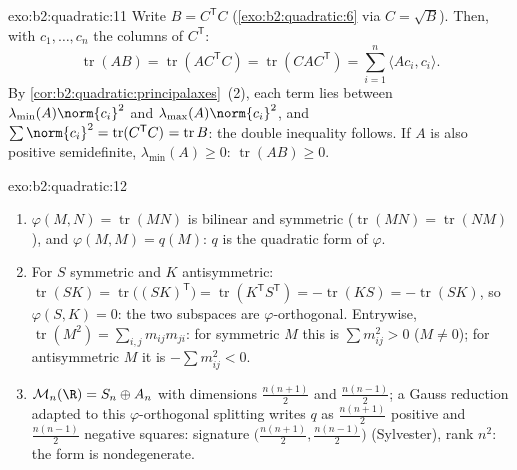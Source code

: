 \begin{solution}{exo:b2:quadratic:11}
Write $B = C^{\mathsf T}C$ (\cref{exo:b2:quadratic:6} via $C =
\sqrt B$). Then, with $c_1, \dots, c_n$ the columns of
$C^{\mathsf T}$:
\[
\operatorname{tr}(AB) = \operatorname{tr}(AC^{\mathsf T}C)
= \operatorname{tr}(CAC^{\mathsf T})
= \sum_{i=1}^n \langle A c_i, c_i\rangle .
\]
By \cref{cor:b2:quadratic:principalaxes}~(2), each term lies
between $\lambda_{\min}(A)\norm{c_i}^2$ and
$\lambda_{\max}(A)\norm{c_i}^2$, and $\sum\norm{c_i}^2 =
\operatorname{tr}(C^{\mathsf T}C)^{\vphantom1} =
\operatorname{tr} B$: the double inequality follows. If $A$ is
also positive semidefinite, $\lambda_{\min}(A) \geq 0$:
$\operatorname{tr}(AB) \geq 0$.
\end{solution}

\begin{solution}{exo:b2:quadratic:12}
\begin{enumerate}
  \item $\varphi(M, N) = \operatorname{tr}(MN)$ is bilinear and
        symmetric ($\operatorname{tr}(MN) =
        \operatorname{tr}(NM)$), and $\varphi(M, M) = q(M)$:
        $q$ is the quadratic form of $\varphi$.
  \item For $S$ symmetric and $K$ antisymmetric:
        $\operatorname{tr}(SK) =
        \operatorname{tr}\bigl((SK)^{\mathsf T}\bigr) =
        \operatorname{tr}(K^{\mathsf T}S^{\mathsf T}) =
        -\operatorname{tr}(KS) = -\operatorname{tr}(SK)$, so
        $\varphi(S, K) = 0$: the two subspaces are
        $\varphi$-orthogonal. Entrywise, $\operatorname{tr}
        (M^2) = \sum_{i,j} m_{ij}m_{ji}$: for symmetric $M$
        this is $\sum m_{ij}^2 > 0$ ($M \neq 0$); for
        antisymmetric $M$ it is $-\sum m_{ij}^2 < 0$.
  \item $\mathcal M_n(\R) = S_n \oplus A_n$ with dimensions
        $\frac{n(n+1)}2$ and $\frac{n(n-1)}2$; a Gauss
        reduction adapted to this $\varphi$-orthogonal
        splitting writes $q$ as $\frac{n(n+1)}2$ positive and
        $\frac{n(n-1)}2$ negative squares: signature
        $\bigl(\frac{n(n+1)}2, \frac{n(n-1)}2\bigr)$
        (Sylvester), rank $n^2$: the form is nondegenerate.
\end{enumerate}
\end{solution}

